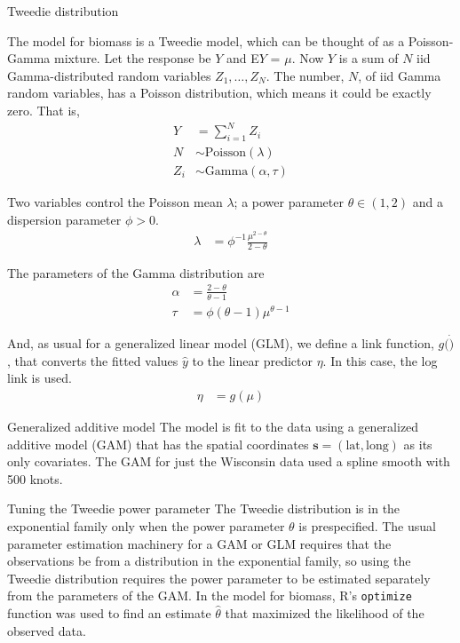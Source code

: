 \documentclass[12pt,t]{beamer}
\begin{document}
\begin{frame}{Tweedie distribution}

The model for biomass is a Tweedie model, which can be thought of as a Poisson-Gamma mixture. Let the response be $Y$ and E$Y$ = $\mu$. Now $Y$ is a sum of $N$ iid Gamma-distributed random variables $Z_1, \dots, Z_N$. The number, $N$, of iid Gamma random variables, has a Poisson distribution, which means it could be exactly zero. That is,
\begin{align*}
    Y &= \sum\limits_{i=1}^N Z_i \\
    N &\sim \text{Poisson}(\lambda) \\
    Z_i &\sim \text{Gamma}(\alpha, \tau)
\end{align*}

Two variables control the Poisson mean $\lambda$; a power parameter $\theta \in (1,2)$ and a dispersion parameter $\phi > 0$.
\begin{align*}
    \lambda &= \phi^{-1} \frac{\mu^{2-\theta}}{2-\theta}
\end{align*}

The parameters of the Gamma distribution are
\begin{align*}
    \alpha &= \frac{2-\theta}{\theta-1} \\
    \tau &= \phi (\theta - 1) \mu^{\theta - 1}
\end{align*}

And, as usual for a generalized linear model (GLM), we define a link function, $g(\dot)$, that converts the fitted values $\hat{y}$ to the linear predictor $\eta$. In this case, the log link is used.
\begin{align*}
    \eta &= g\left(\mu\right)
\end{align*}
\end{frame}



\begin{frame}{Generalized additive model}
The model is fit to the data using a generalized additive model (GAM) that has the spatial coordinates $\bm{s} = (\text{lat}, \text{long})$ as its only covariates. The GAM for just the Wisconsin data used a spline smooth with 500 knots. 
\end{frame}


\begin{frame}[fragile]{Tuning the Tweedie power parameter}
The Tweedie distribution is in the exponential family only when the power parameter $\theta$ is prespecified. The usual parameter estimation machinery for a GAM or GLM requires that the observations be from a distribution in the exponential family, so using the Tweedie distribution requires the power parameter to be estimated separately from the parameters of the GAM. In the model for biomass, R's \verb!optimize! function was used to find an estimate $\hat{\theta}$ that maximized the likelihood of the observed data.
\end{frame}
\end{document}
